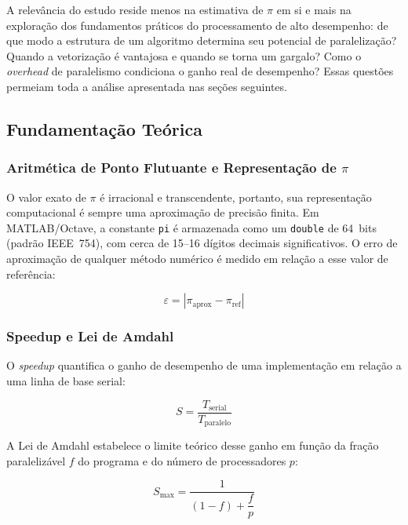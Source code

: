 \documentclass[12pt, a4paper]{article}
\begin{document}
	A relevância do estudo reside menos na estimativa de $\pi$ em si e mais na
	exploração dos fundamentos práticos do processamento de alto desempenho: de que
	modo a estrutura de um algoritmo determina seu potencial de paralelização? Quando
	a vetorização é vantajosa e quando se torna um gargalo? Como o \textit{overhead}
	de paralelismo condiciona o ganho real de desempenho? Essas questões permeiam toda
	a análise apresentada nas seções seguintes.
	
	\subsection{Fundamentação Teórica}
	
	\subsubsection{Aritmética de Ponto Flutuante e Representação de $\pi$}
	
	O valor exato de $\pi$ é irracional e transcendente, portanto, sua representação
	computacional é sempre uma aproximação de precisão finita. Em MATLAB/Octave, a
	constante \texttt{pi} é armazenada como um \texttt{double} de 64~bits (padrão
	IEEE~754), com cerca de 15--16 dígitos decimais significativos. O erro de
	aproximação de qualquer método numérico é medido em relação a esse valor de
	referência:
	
	\begin{equation}
		\varepsilon = \left| \pi_{\text{aprox}} - \pi_{\text{ref}} \right|
		\label{eq:erro}
	\end{equation}
	
	\subsubsection{Speedup e Lei de Amdahl}
	
	O \textit{speedup} quantifica o ganho de desempenho de uma implementação em relação
	a uma linha de base serial:
	
	\begin{equation}
		S = \frac{T_{\text{serial}}}{T_{\text{paralelo}}}
		\label{eq:speedup}
	\end{equation}
	
	A Lei de Amdahl estabelece o limite teórico desse ganho em função da fração
	paralelizável $f$ do programa e do número de processadores $p$:
	
	\begin{equation}
		S_{\max} = \frac{1}{(1-f) + \dfrac{f}{p}}
		\label{eq:amdahl}
	\end{equation}
	
\end{document}

